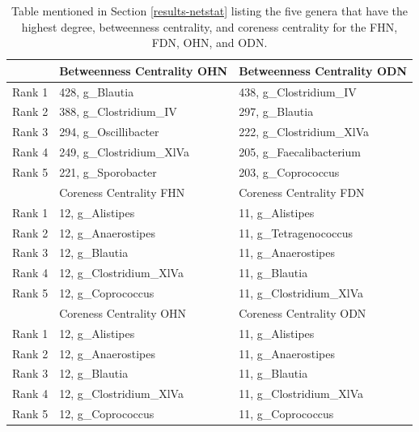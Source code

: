 \begin{table}[!hbtp]
\begin{tabular}{rll}
 & Betweenness Centrality OHN & Betweenness Centrality ODN \\ 
  \midrule
Rank 1 & 428,  g\_Blautia & 438,  g\_Clostridium\_IV \\ 
  Rank 2 & 388,  g\_Clostridium\_IV & 297,  g\_Blautia \\ 
  Rank 3 & 294,  g\_Oscillibacter & 222,  g\_Clostridium\_XlVa \\ 
  Rank 4 & 249,  g\_Clostridium\_XlVa & 205,  g\_Faecalibacterium \\ 
  Rank 5 & 221,  g\_Sporobacter & 203,  g\_Coprococcus \\ 
\bottomrule \toprule
 & Coreness Centrality FHN & Coreness Centrality FDN \\ 
  \midrule
Rank 1 & 12,  g\_Alistipes & 11,  g\_Alistipes \\ 
  Rank 2 & 12,  g\_Anaerostipes & 11,  g\_Tetragenococcus \\ 
  Rank 3 & 12,  g\_Blautia & 11,  g\_Anaerostipes \\ 
  Rank 4 & 12,  g\_Clostridium\_XlVa & 11,  g\_Blautia \\ 
  Rank 5 & 12,  g\_Coprococcus & 11,  g\_Clostridium\_XlVa \\ 
   \midrule
   
 & Coreness Centrality OHN & Coreness Centrality ODN \\ 
  \midrule
Rank 1 & 12,  g\_Alistipes & 11,  g\_Alistipes \\ 
  Rank 2 & 12,  g\_Anaerostipes & 11,  g\_Anaerostipes \\ 
  Rank 3 & 12,  g\_Blautia & 11,  g\_Blautia \\ 
  Rank 4 & 12,  g\_Clostridium\_XlVa & 11,  g\_Clostridium\_XlVa \\ 
  Rank 5 & 12,  g\_Coprococcus & 11,  g\_Coprococcus \\ 
   \bottomrule
\end{tabular}
\caption{Table mentioned in Section \ref{results-netstat} listing the five genera that have the highest degree, betweenness centrality, and coreness centrality for the \acrfull{FHN}, \acrfull{FDN}, \acrfull{OHN}, and \acrfull{ODN}.}
\label{tab:node-measures}
\end{table}

